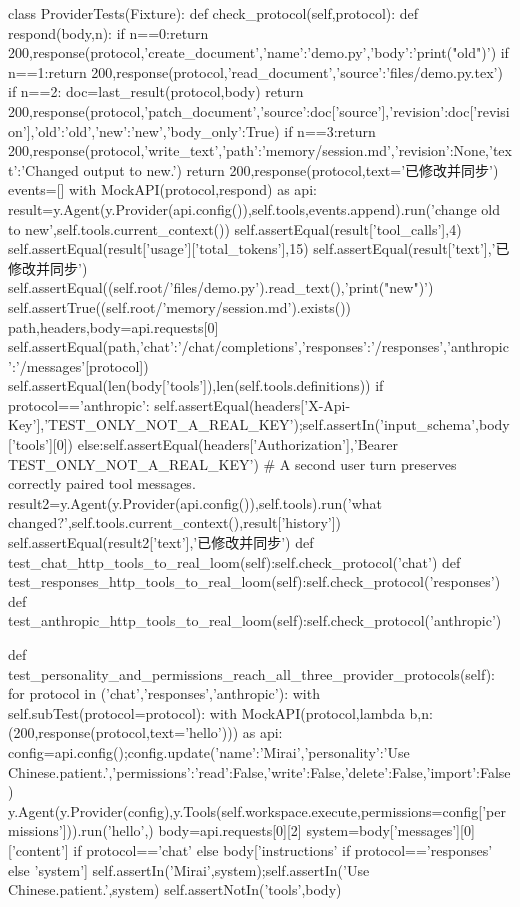 class ProviderTests(Fixture):
    def check_protocol(self,protocol):
        def respond(body,n):
            if n==0:return 200,response(protocol,'create_document',{'name':'demo.py','body':'print("old")'})
            if n==1:return 200,response(protocol,'read_document',{'source':'files/demo.py.tex'})
            if n==2:
                doc=last_result(protocol,body)
                return 200,response(protocol,'patch_document',{'source':doc['source'],'revision':doc['revision'],'old':'old','new':'new','body_only':True})
            if n==3:return 200,response(protocol,'write_text',{'path':'memory/session.md','revision':None,'text':'Changed output to new.'})
            return 200,response(protocol,text='已修改并同步')
        events=[]
        with MockAPI(protocol,respond) as api:
            result=y.Agent(y.Provider(api.config()),self.tools,events.append).run('change old to new',self.tools.current_context())
            self.assertEqual(result['tool_calls'],4)
            self.assertEqual(result['usage']['total_tokens'],15)
            self.assertEqual(result['text'],'已修改并同步')
            self.assertEqual((self.root/'files/demo.py').read_text(),'print("new")')
            self.assertTrue((self.root/'memory/session.md').exists())
            path,headers,body=api.requests[0]
            self.assertEqual(path,{'chat':'/chat/completions','responses':'/responses','anthropic':'/messages'}[protocol])
            self.assertEqual(len(body['tools']),len(self.tools.definitions))
            if protocol=='anthropic':
                self.assertEqual(headers['X-Api-Key'],'TEST_ONLY_NOT_A_REAL_KEY');self.assertIn('input_schema',body['tools'][0])
            else:self.assertEqual(headers['Authorization'],'Bearer TEST_ONLY_NOT_A_REAL_KEY')
            # A second user turn preserves correctly paired tool messages.
            result2=y.Agent(y.Provider(api.config()),self.tools).run('what changed?',self.tools.current_context(),result['history'])
            self.assertEqual(result2['text'],'已修改并同步')
    def test_chat_http_tools_to_real_loom(self):self.check_protocol('chat')
    def test_responses_http_tools_to_real_loom(self):self.check_protocol('responses')
    def test_anthropic_http_tools_to_real_loom(self):self.check_protocol('anthropic')

    def test_personality_and_permissions_reach_all_three_provider_protocols(self):
        for protocol in ('chat','responses','anthropic'):
            with self.subTest(protocol=protocol):
                with MockAPI(protocol,lambda b,n:(200,response(protocol,text='hello'))) as api:
                    config=api.config();config.update({'name':'Mirai','personality':'Use Chinese.\nBe patient.','permissions':{'read':False,'write':False,'delete':False,'import':False}})
                    y.Agent(y.Provider(config),y.Tools(self.workspace.execute,permissions=config['permissions'])).run('hello',{})
                    body=api.requests[0][2]
                    system=body['messages'][0]['content'] if protocol=='chat' else body['instructions' if protocol=='responses' else 'system']
                    self.assertIn('Mirai',system);self.assertIn('Use Chinese.\nBe patient.',system)
                    self.assertNotIn('tools',body)


